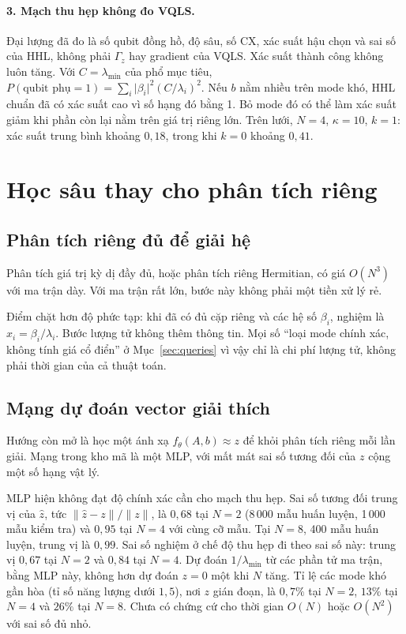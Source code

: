 \documentclass[11pt,a4paper]{article}
\newenvironment{revisedblock}{\par\color{revised}\ignorespaces}{\par}
\begin{document}
\begin{revisedblock}
\paragraph{3. Mạch thu hẹp không đo VQLS.}
Đại lượng đã đo là số qubit đồng hồ, độ sâu, số CX, xác suất hậu chọn và sai số của HHL, không phải \(\Gamma_z\) hay gradient của VQLS.
Xác suất thành công không luôn tăng.
Với \(C=\lambda_{\min}\) của phổ mục tiêu,
\(P(\text{qubit phụ}=1)=\sum_i\lvert\beta_i\rvert^2(C/\lambda_i)^2\).
Nếu \(b\) nằm nhiều trên mode khó, HHL chuẩn đã có xác suất cao vì số hạng đó bằng 1.
Bỏ mode đó có thể làm xác suất giảm khi phần còn lại nằm trên giá trị riêng lớn.
Trên lưới, \(N=4\), \(\kappa=10\), \(k=1\): xác suất trung bình khoảng \(0{,}18\), trong khi \(k=0\) khoảng \(0{,}41\).
\end{revisedblock}

\section{Học sâu thay cho phân tích riêng}

\subsection{Phân tích riêng đủ để giải hệ}
Phân tích giá trị kỳ dị đầy đủ, hoặc phân tích riêng Hermitian, có giá \(O(N^3)\) với ma trận dày.
Với ma trận rất lớn, bước này không phải một tiền xử lý rẻ.

\begin{revisedblock}
Điểm chặt hơn độ phức tạp: khi đã có đủ cặp riêng và các hệ số \(\beta_i\), nghiệm là \(x_i=\beta_i/\lambda_i\).
Bước lượng tử không thêm thông tin.
Mọi số ``loại mode chính xác, không tính giá cổ điển'' ở Mục~\ref{sec:queries} vì vậy chỉ là chi phí lượng tử, không phải thời gian của cả thuật toán.
\end{revisedblock}

\subsection{Mạng dự đoán vector giải thích}
Hướng còn mở là học một ánh xạ \(f_\theta(A,b)\approx z\) để khỏi phân tích riêng mỗi lần giải.
Mạng trong kho mã là một MLP, với mất mát sai số tương đối của \(z\) cộng một số hạng vật lý.

\begin{revisedblock}
MLP hiện không đạt độ chính xác cần cho mạch thu hẹp.
Sai số tương đối trung vị của \(\hat z\), tức \(\lVert\hat z-z\rVert/\lVert z\rVert\), là \(0{,}68\) tại \(N=2\) (8\,000 mẫu huấn luyện, 1\,000 mẫu kiểm tra) và \(0{,}95\) tại \(N=4\) với cùng cỡ mẫu.
Tại \(N=8\), 400 mẫu huấn luyện, trung vị là \(0{,}99\).
Sai số nghiệm ở chế độ thu hẹp đi theo sai số này: trung vị \(0{,}67\) tại \(N=2\) và \(0{,}84\) tại \(N=4\).
Dự đoán \(1/\lambda_{\min}\) từ các phần tử ma trận, bằng MLP này, không hơn dự đoán \(z=0\) một khi \(N\) tăng.
Tỉ lệ các mode khó gần hòa (tỉ số năng lượng dưới \(1{,}5\)), nơi \(z\) gián đoạn, là \(0{,}7\%\) tại \(N=2\), \(13\%\) tại \(N=4\) và \(26\%\) tại \(N=8\).
Chưa có chứng cứ cho thời gian \(O(N)\) hoặc \(O(N^2)\) với sai số đủ nhỏ.
\end{revisedblock}
\end{document}
